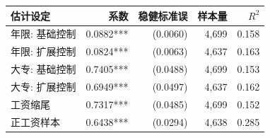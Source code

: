 \begin{tabular}{lrrrr}
\toprule
估计设定 & 系数 & 稳健标准误 & 样本量 & $R^2$ \\
\midrule
年限: 基础控制 & 0.0882*** & (0.0060) & 4,699 & 0.158 \\
年限: 扩展控制 & 0.0824*** & (0.0063) & 4,637 & 0.163 \\
大专: 基础控制 & 0.7405*** & (0.0488) & 4,699 & 0.153 \\
大专: 扩展控制 & 0.6949*** & (0.0497) & 4,637 & 0.162 \\
工资缩尾 & 0.7317*** & (0.0485) & 4,699 & 0.152 \\
正工资样本 & 0.6438*** & (0.0294) & 4,638 & 0.285 \\
\bottomrule
\end{tabular}
